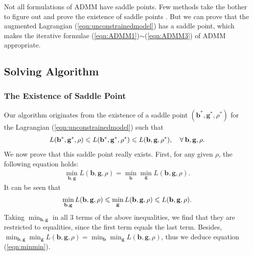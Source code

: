 \documentclass[twoside,11pt]{article}
\begin{document}
Not all formulations of ADMM have saddle points. Few methods take the bother to figure out and prove the existence of saddle points \citep{olazyupdate,itershrin,multclassimg}. But we can prove that the augmented Lagrangian (\ref{eqn:unconstrainedmodel}) has a saddle point, which makes the iterative formulae (\ref{eqn:ADMM1})$\sim$(\ref{eqn:ADMM3}) of ADMM appropriate.




\subsection{Solving Algorithm}
\label{sec:solver}


\subsubsection{The Existence of Saddle Point}
\label{sec:saddlepoint}
Our algorithm originates from the existence of a saddle point $(\mathbf{b}^*,\mathbf{g}^*,\rho^*)$ for the Lagrangian (\ref{eqn:unconstrainedmodel}) such that
\begin{eqnarray}
\label{eqn:saddlepoint}
 L(\mathbf{b}^*,\mathbf{g}^*,\rho)\leqslant  L(\mathbf{b}^*,\mathbf{g}^*,\rho^*)\leqslant  L(\mathbf{b},\mathbf{g},\rho^*),\quad \forall \: \mathbf{b},\mathbf{g},\rho.
\end{eqnarray}
We now prove that this saddle point really exists. First, for any given $\rho$, the following equation holds:
\begin{eqnarray}
\label{eqn:minmin}
 \min_{\mathbf{b},\mathbf{g}}L(\mathbf{b},\mathbf{g},\rho)= \min_{\mathbf{b}}\min_{\mathbf{g}}L(\mathbf{b},\mathbf{g},\rho).
\end{eqnarray}
It can be seen that
\begin{eqnarray}
\label{eqn:minmin1}
 \min_{\mathbf{b},\mathbf{g}}L(\mathbf{b},\mathbf{g},\rho)\leqslant \min_{\mathbf{g}}L(\mathbf{b},\mathbf{g},\rho)\leqslant L(\mathbf{b},\mathbf{g},\rho).
\end{eqnarray}
Taking $\min_{\mathbf{b},\mathbf{g}}$ in all $3$ terms of the above inequalities, we find that they are restricted to equalities, since the first term equals the last term. Besides, $\min_{\mathbf{b},\mathbf{g}}\min_{\mathbf{g}}L(\mathbf{b},\mathbf{g},\rho)=\min_{\mathbf{b}}\min_{\mathbf{g}}L(\mathbf{b},\mathbf{g},\rho)$, thus we deduce equation (\ref{eqn:minmin}).
\end{document}
